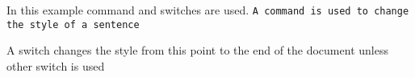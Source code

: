 In this example command and switches are used. 
\texttt{A command is used to change the style 
of a sentence}
 
\rmfamily
A switch changes the style from this point to 
the end of the document unless other switch is used